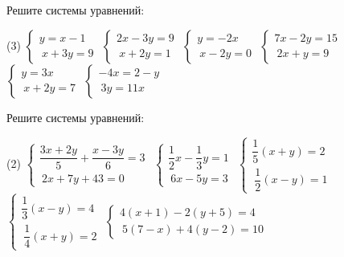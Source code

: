 \begin{class}[number=5]
	\begin{listofex}
		\item Решите системы уравнений:
		\begin{tasks}(3)
			\task \( \begin{cases}
				y=x-1\\\ x+3y=9
			\end{cases} \)
			\task \( \begin{cases}
				2x-3y=9\\\ x+2y=1
			\end{cases} \)
			\task \( \begin{cases}
				y=-2x\\\ x-2y=0
			\end{cases} \)
			\task \( \begin{cases}
				7x-2y=15\\\ 2x+y=9
			\end{cases} \)
			\task \( \begin{cases}
				y=3x\\\ x+2y=7
			\end{cases} \)
			\task \( \begin{cases}
				-4x=2-y\\\ 3y=11x
			\end{cases} \)
		\end{tasks}
		\item Решите системы уравнений:
		\begin{tasks}(2)
			\task \( \begin{cases}
				\dfrac{3x+2y}{5}+\dfrac{x-3y}{6}=3\\\ 2x+7y+43=0
			\end{cases} \)
			\task \( \begin{cases}
				\dfrac{1}{2}x-\dfrac{1}{3}y=1\\\ 6x-5y=3
			\end{cases} \)
			\task \( \begin{cases}
				\dfrac{1}{5}(x+y)=2\\\ \dfrac{1}{2}(x-y)=1
			\end{cases} \)
			\task \( \begin{cases}
				\dfrac{1}{3}(x-y)=4\\\ \dfrac{1}{4}(x+y)=2
			\end{cases} \)
			\task \( \begin{cases}
				4(x+1)-2(y+5)=4\\\ 5(7-x)+4(y-2)=10
			\end{cases} \)

\end{tasks}
\end{listofex}
\end{class}

